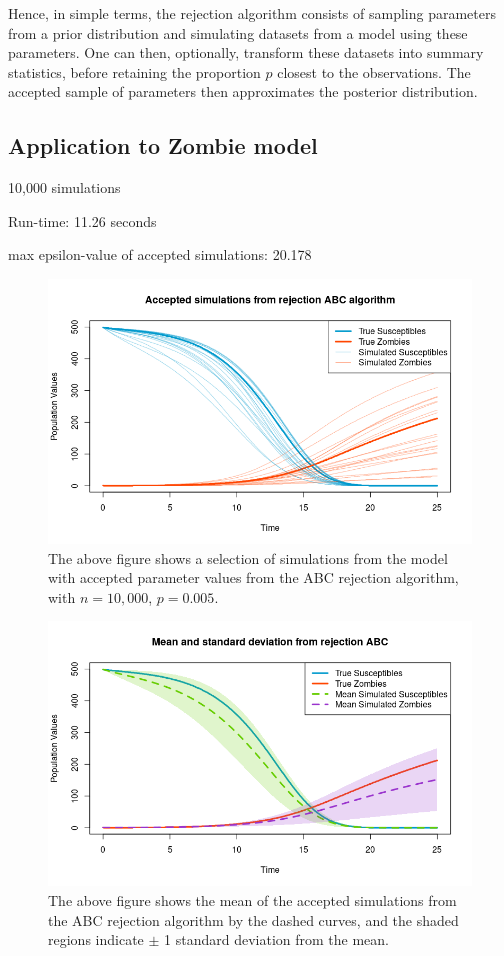 \documentclass[]{article}
\begin{document}
\noindent Hence, in simple terms, the rejection algorithm consists of sampling parameters from a prior distribution and simulating datasets from a model using these parameters. One can then, optionally, transform these datasets into summary statistics, before retaining the proportion $p$ closest to the observations. The accepted sample of parameters then approximates the posterior distribution.

\subsection{Application to Zombie model}

10,000 simulations

Run-time: 11.26 seconds

max epsilon-value of accepted simulations: 20.178

\begin{figure}[H]
\centering
\includegraphics[width=0.8\linewidth]{../Figures/rej_ABC_simulations}
\caption{The above figure shows a selection of simulations from the model with accepted parameter values from the ABC rejection algorithm, with $n=10,000$, $p=0.005$.}
\label{rej_abc_acc_simulations}
\end{figure}

\begin{figure}[H]
	\centering
	\includegraphics[width=0.8\linewidth]{../Figures/rej_abc_sd_bands}
	\caption{The above figure shows the mean of the accepted simulations from the ABC rejection algorithm by the dashed curves, and the shaded regions indicate $\pm$ 1 standard deviation from the mean.}
	\label{rej_abc_sd}
\end{figure}
\end{document}
